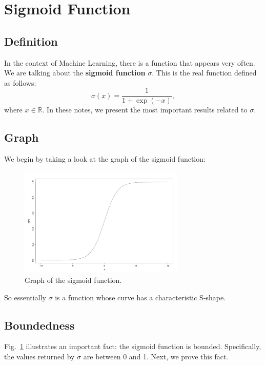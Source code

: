 \documentclass[10pt,american]{scrartcl}
\begin{document}
\section*{Sigmoid Function}

\subsection*{Definition}

In the context of Machine Learning, there is a function that appears very
often. We are talking about the \textbf{sigmoid function} $\sigma$. This is the
real function defined as follows:
\begin{equation}
\sigma\left(x\right)=\frac{1}{1+\exp\left(-x\right)},
\label{eq:defn_sigma}
\end{equation}
where $x\in\mathbb{R}$. In these notes, we present the most important results
related to $\sigma$.

\subsection*{Graph}

We begin by taking a look at the graph of the sigmoid function:
\begin{figure}[H]
\centering
\includegraphics[width=0.7\textwidth]{../r/sigmoid.png}
\caption{Graph of the sigmoid function.}
\label{fig:graph_sigma}
\end{figure}
So essentially $\sigma$ is a function whose curve has a characteristic S-shape.

\subsection*{Boundedness}

Fig.~\ref{fig:graph_sigma} illustrates an important fact: the sigmoid function
is bounded. Specifically, the values returned by $\sigma$ are between 0 and 1.
Next, we prove this fact.
\end{document}
